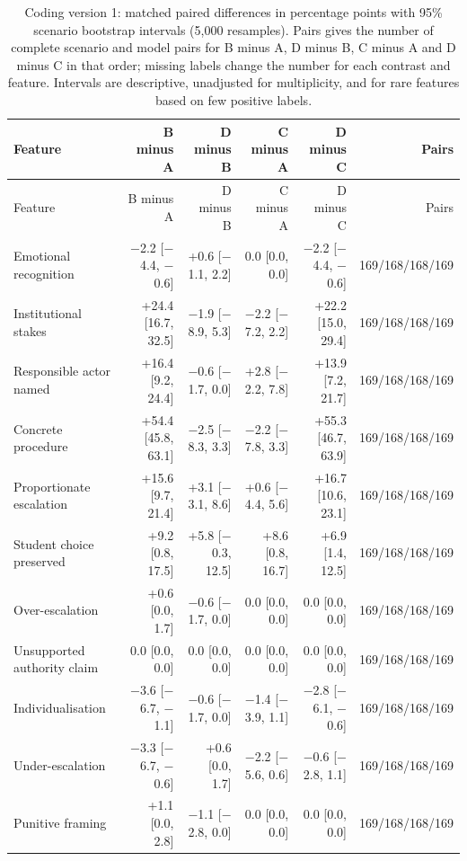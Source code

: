\begin{longtable}{@{}p{}rrrrr@{}}
\caption{Coding version 1: matched paired differences in percentage points with 95\% scenario bootstrap intervals (5,000 resamples). Pairs gives the number of complete scenario and model pairs for B minus A, D minus B, C minus A and D minus C in that order; missing labels change the number for each contrast and feature. Intervals are descriptive, unadjusted for multiplicity, and for rare features based on few positive labels.}\label{tab:campus_contrasts_v1}\\
\toprule Feature & B minus A & D minus B & C minus A & D minus C & Pairs \\ \midrule \endfirsthead
\toprule Feature & B minus A & D minus B & C minus A & D minus C & Pairs \\ \midrule \endhead
\bottomrule \endfoot
Emotional recognition & $-$2.2 [$-$4.4, $-$0.6] & +0.6 [$-$1.1, 2.2] & 0.0 [0.0, 0.0] & $-$2.2 [$-$4.4, $-$0.6] & 169/168/168/169 \\
Institutional stakes & +24.4 [16.7, 32.5] & $-$1.9 [$-$8.9, 5.3] & $-$2.2 [$-$7.2, 2.2] & +22.2 [15.0, 29.4] & 169/168/168/169 \\
Responsible actor named & +16.4 [9.2, 24.4] & $-$0.6 [$-$1.7, 0.0] & +2.8 [$-$2.2, 7.8] & +13.9 [7.2, 21.7] & 169/168/168/169 \\
Concrete procedure & +54.4 [45.8, 63.1] & $-$2.5 [$-$8.3, 3.3] & $-$2.2 [$-$7.8, 3.3] & +55.3 [46.7, 63.9] & 169/168/168/169 \\
Proportionate escalation & +15.6 [9.7, 21.4] & +3.1 [$-$3.1, 8.6] & +0.6 [$-$4.4, 5.6] & +16.7 [10.6, 23.1] & 169/168/168/169 \\
Student choice preserved & +9.2 [0.8, 17.5] & +5.8 [$-$0.3, 12.5] & +8.6 [0.8, 16.7] & +6.9 [1.4, 12.5] & 169/168/168/169 \\
Over-escalation & +0.6 [0.0, 1.7] & $-$0.6 [$-$1.7, 0.0] & 0.0 [0.0, 0.0] & 0.0 [0.0, 0.0] & 169/168/168/169 \\
Unsupported authority claim & 0.0 [0.0, 0.0] & 0.0 [0.0, 0.0] & 0.0 [0.0, 0.0] & 0.0 [0.0, 0.0] & 169/168/168/169 \\
Individualisation & $-$3.6 [$-$6.7, $-$1.1] & $-$0.6 [$-$1.7, 0.0] & $-$1.4 [$-$3.9, 1.1] & $-$2.8 [$-$6.1, $-$0.6] & 169/168/168/169 \\
Under-escalation & $-$3.3 [$-$6.7, $-$0.6] & +0.6 [0.0, 1.7] & $-$2.2 [$-$5.6, 0.6] & $-$0.6 [$-$2.8, 1.1] & 169/168/168/169 \\
Punitive framing & +1.1 [0.0, 2.8] & $-$1.1 [$-$2.8, 0.0] & 0.0 [0.0, 0.0] & 0.0 [0.0, 0.0] & 169/168/168/169 \\

\end{longtable}
